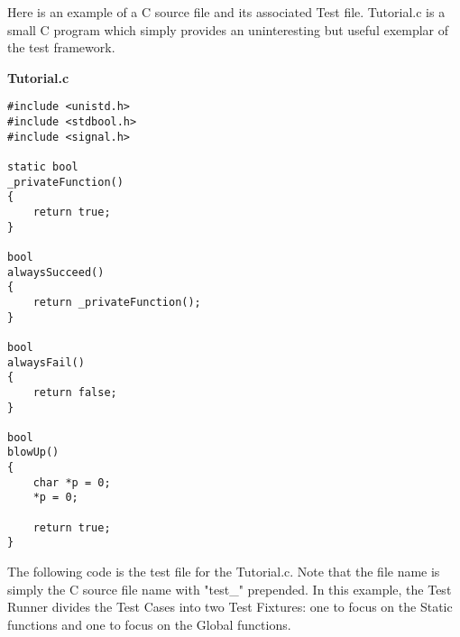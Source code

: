 \documentclass[12pt]{article} %
\begin{document}
Here is an example of a C source file and its associated Test file.  Tutorial.c is a small C program which simply  provides an uninteresting but useful exemplar of the test framework.


\noindent \textbf{Tutorial.c}

\begin{lstlisting}
#include <unistd.h>
#include <stdbool.h>
#include <signal.h>

static bool
_privateFunction()
{
    return true;
}

bool
alwaysSucceed()
{
	return _privateFunction();
}

bool
alwaysFail()
{
	return false;
}

bool
blowUp()
{
    char *p = 0;
    *p = 0;
    
    return true;
}

\end{lstlisting}

The following code is the test file for the Tutorial.c.  Note that the file name is simply the C source file name with "test\_" prepended. In this example, the Test Runner divides the Test Cases into two Test Fixtures: one to focus on the Static functions and one to focus on the Global functions.
\end{document}
